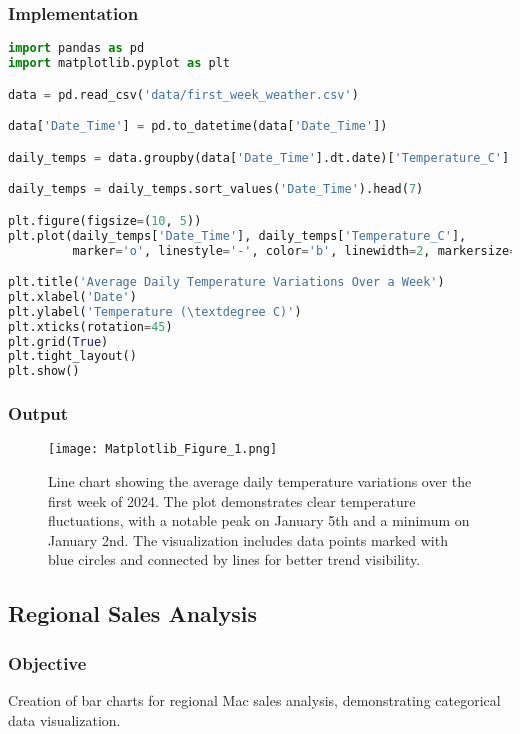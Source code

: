 \documentclass[12pt]{article}
\begin{document}
\subsubsection{Implementation}
\begin{lstlisting}[language=Python, caption=Temperature Analysis Implementation]
import pandas as pd
import matplotlib.pyplot as plt

data = pd.read_csv('data/first_week_weather.csv')

data['Date_Time'] = pd.to_datetime(data['Date_Time'])

daily_temps = data.groupby(data['Date_Time'].dt.date)['Temperature_C'].mean().reset_index()

daily_temps = daily_temps.sort_values('Date_Time').head(7)

plt.figure(figsize=(10, 5))
plt.plot(daily_temps['Date_Time'], daily_temps['Temperature_C'], 
         marker='o', linestyle='-', color='b', linewidth=2, markersize=8)

plt.title('Average Daily Temperature Variations Over a Week')
plt.xlabel('Date')
plt.ylabel('Temperature (\textdegree C)')
plt.xticks(rotation=45)
plt.grid(True)
plt.tight_layout()
plt.show()

\end{lstlisting}

\subsubsection{Output}
\begin{figure}[h]
    \centering
    \texttt{[image: Matplotlib\_Figure\_1.png]}
    \caption{Line chart showing the average daily temperature variations over the first week of 2024. The plot demonstrates clear temperature fluctuations, with a notable peak on January 5th and a minimum on January 2nd. The visualization includes data points marked with blue circles and connected by lines for better trend visibility.}
    \label{fig:temperature_variation}
\end{figure}

\subsection{Regional Sales Analysis\hfill\href{https://github.com/sabbirahmed404/Python-Practice/blob/main/matplotlib_2.py}{\faGithub}}
\subsubsection{Objective}
Creation of bar charts for regional Mac sales analysis, demonstrating categorical data visualization.
\end{document}
